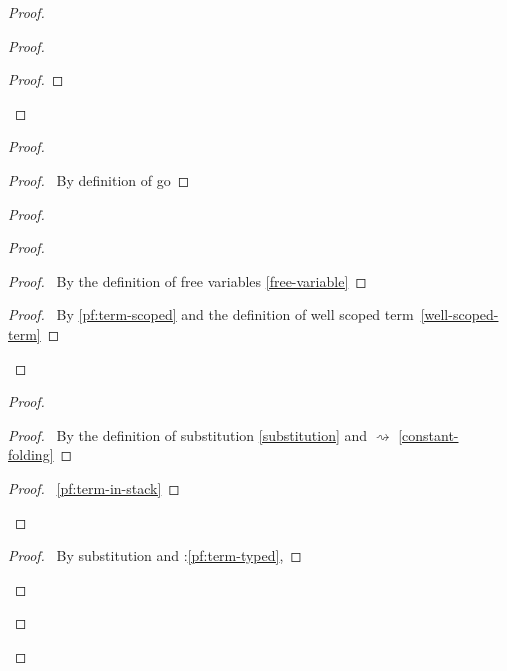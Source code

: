 \documentclass[a4paper]{article}
\begin{document}
\begin{proof}
\begin{proof}
\begin{proof}
    \end{proof}
  \end{proof}
  \begin{proof}
    \begin{proof}
      \pf\ By definition of \textsf{go}
    \end{proof}
    \begin{proof}
      \begin{proof}
        \begin{proof}
          \pf\ By the definition of free variables \ref{free-variable}
        \end{proof}
        \qedstep
        \begin{proof}
          \pf\ By \ref{pf:term-scoped} and the definition of well scoped term~\ref{well-scoped-term}
        \end{proof}
      \end{proof}
      \begin{proof}
        \begin{proof}
          \pf\ By the definition of substitution \ref{substitution} and $\rightsquigarrow$ \ref{constant-folding}
        \end{proof}
        \qedstep
        \begin{proof}
          \pf\ \ref{pf:term-in-stack}
        \end{proof}
      \end{proof}
      \begin{proof}
        \pf\ By substitution and \toplevel:\ref{pf:term-typed},

\end{proof}
\end{proof}
\end{proof}
\end{proof}
\end{document}
